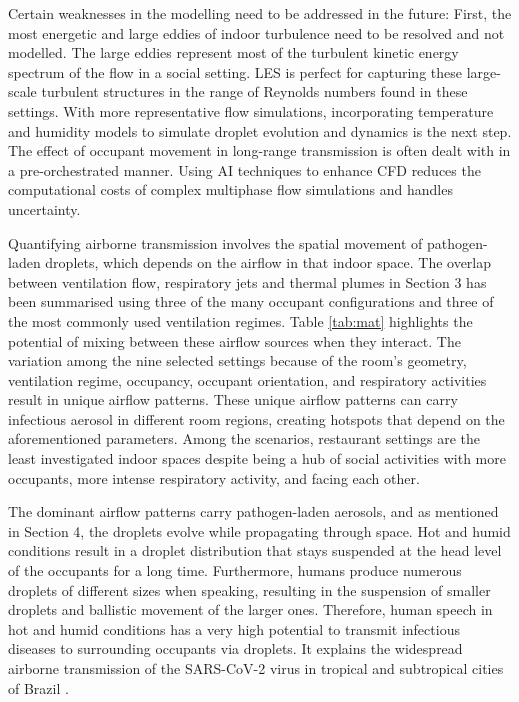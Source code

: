 \documentclass[a4paper,12pt]{elsarticle}
\begin{document}
Certain weaknesses in the modelling need to be addressed in the future: First, the most energetic and large eddies of indoor turbulence need to be resolved and not modelled. The large eddies represent most of the turbulent kinetic energy spectrum of the flow in a social setting. LES is perfect for capturing these large-scale turbulent structures in the range of Reynolds numbers found in these settings. With more representative flow simulations, incorporating temperature and humidity models to simulate droplet evolution and dynamics is the next step. The effect of occupant movement in long-range transmission is often dealt with in a pre-orchestrated manner. Using AI techniques to enhance CFD reduces the computational costs of complex multiphase flow simulations and handles uncertainty.

Quantifying airborne transmission involves the spatial movement of pathogen-laden droplets, which depends on the airflow in that indoor space. The overlap between ventilation flow, respiratory jets and thermal plumes in Section 3 has been summarised using three of the many occupant configurations and three of the most commonly used ventilation regimes. Table \ref{tab:mat} highlights the potential of mixing between these airflow sources when they interact. The variation among the nine selected settings because of the room's geometry, ventilation regime, occupancy, occupant orientation, and respiratory activities result in unique airflow patterns. These unique airflow patterns can carry infectious aerosol in different room regions, creating hotspots that depend on the aforementioned parameters. Among the scenarios, restaurant settings are the least investigated indoor spaces despite being a hub of social activities with more occupants, more intense respiratory activity, and facing each other.

The dominant airflow patterns carry pathogen-laden aerosols, and as mentioned in Section 4, the droplets evolve while propagating through space. Hot and humid conditions result in a droplet distribution that stays suspended at the head level of the occupants for a long time. Furthermore, humans produce numerous droplets of different sizes when speaking, resulting in the suspension of smaller droplets and ballistic movement of the larger ones. Therefore, human speech in hot and humid conditions has a very high potential to transmit infectious diseases to surrounding occupants via droplets. It explains the widespread airborne transmission of the SARS-CoV-2 virus in tropical and subtropical cities of Brazil \cite{prata2020temperature}. 
\end{document}
